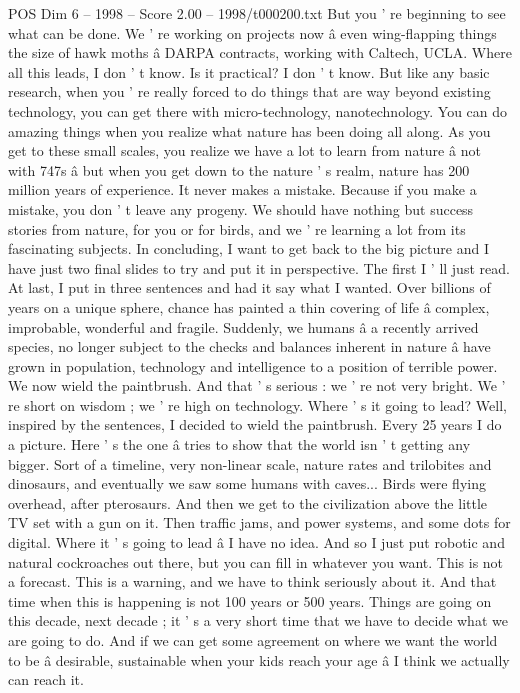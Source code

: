 \begin{textsample}{POS Dim 6 – 1998 – Score 2.00 – 1998/t000200.txt}
But you ' re beginning to see what can be done.
We ' re working on projects now â even wing-flapping things the size of hawk moths â DARPA contracts, working with Caltech, UCLA.
Where all this leads, I don ' t know.
Is it practical?
I don ' t know.
But like any basic research, when you ' re really forced to do things that are way beyond existing technology, you can get there with micro-technology, nanotechnology.
You can do amazing things when you realize what nature has been doing all along.
As you get to these small scales, you realize we have a lot to learn from nature â not with 747s â but when you get down to the nature ' s realm, nature has 200 million years of experience.
It never makes a mistake.
Because if you make a mistake, you don ' t leave any progeny.
We should have nothing but success stories from nature, for you or for birds, and we ' re learning a lot from its fascinating subjects.
In concluding, I want to get back to the big picture and I have just two final slides to try and put it in perspective.
The first I ' ll just read.
At last, I put in three sentences and had it say what I wanted.
Over billions of years on a unique sphere, chance has painted a thin covering of life â complex, improbable, wonderful and fragile.
Suddenly, we humans â a recently arrived species, no longer subject to the checks and balances inherent in nature â have grown in population, technology and intelligence to a position of terrible power.
We now wield the paintbrush.
And that ' s serious : we ' re not very bright.
We ' re short on wisdom ; we ' re high on technology.
Where ' s it going to lead?
Well, inspired by the sentences, I decided to wield the paintbrush.
Every 25 years I do a picture.
Here ' s the one â tries to show that the world isn ' t getting any bigger.
Sort of a timeline, very non-linear scale, nature rates and trilobites and dinosaurs, and eventually we saw some humans with caves...
Birds were flying overhead, after pterosaurs.
And then we get to the civilization above the little TV set with a gun on it.
Then traffic jams, and power systems, and some dots for digital.
Where it ' s going to lead â I have no idea.
And so I just put robotic and natural cockroaches out there, but you can fill in whatever you want.
This is not a forecast.
This is a warning, and we have to think seriously about it.
And that time when this is happening is not 100 years or 500 years.
Things are going on this decade, next decade ; it ' s a very short time that we have to decide what we are going to do.
And if we can get some agreement on where we want the world to be â desirable, sustainable when your kids reach your age â I think we actually can reach it.

\end{textsample}
